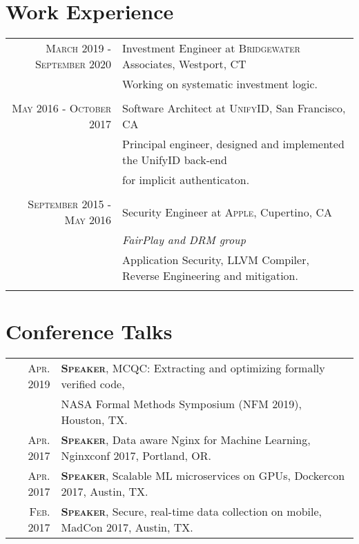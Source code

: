 \documentclass[lettersize,11pt]{article}
\begin{document}
\section{Work Experience}
\begin{tabular}{rl}
\textsc{March 2019 - September 2020} & Investment Engineer at \textsc{Bridgewater} Associates, Westport, CT\\
&\footnotesize{Working on systematic investment logic.}\\\multicolumn{2}{c}{} \\

\textsc{May 2016 - October 2017} & Software Architect at \textsc{UnifyID}, San Francisco, CA\\
&\footnotesize{Principal engineer, designed and implemented the UnifyID back-end}\\
&\footnotesize{for implicit authenticaton.}\\\multicolumn{2}{c}{} \\

\textsc{September 2015 - May 2016} & Security Engineer at \textsc{Apple}, Cupertino, CA \\&\emph{FairPlay and DRM group}\\
&\footnotesize{Application Security, LLVM Compiler, Reverse Engineering and mitigation.} \\\multicolumn{2}{c}{} \\
\end{tabular}


\section{Conference Talks}
\begin{tabular}{rl}
    \textsc{Apr.} 2019 & \textsc{\textbf{Speaker}}, MCQC: Extracting and optimizing formally verified code, \\
     &                                              NASA Formal Methods Symposium (NFM 2019), Houston, TX. \\
    \textsc{Apr.} 2017 & \textsc{\textbf{Speaker}}, Data aware Nginx for Machine Learning, Nginxconf 2017, Portland, OR. \\
    \textsc{Apr.} 2017 & \textsc{\textbf{Speaker}}, Scalable ML microservices on GPUs, Dockercon 2017, Austin, TX. \\
    \textsc{Feb.} 2017 & \textsc{\textbf{Speaker}}, Secure, real-time data collection on mobile, MadCon 2017, Austin, TX. \\
\end{tabular}
\end{document}
